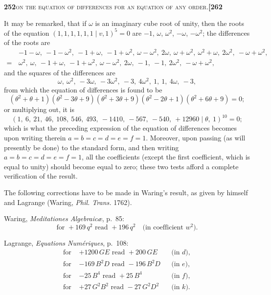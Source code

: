 \documentclass[11pt]{article}
\newcommand{\Cdel}{\mid}
\begin{document}
\newpage
\noindent\textbf{252}\hfill\textsc{on the equation of differences for an equation of any order.}\hfill\textbf{[262}

\medskip

\noindent It may be remarked, that if $\omega$ is an imaginary cube root of unity, then the roots of the equation $(1, 1, 1, 1, 1, 1 \Cdel v, 1)^5 = 0$ are $-1$, $\omega$, $\omega^2$, $-\omega$, $-\omega^2$; the differences of the roots are
\[
\begin{aligned}
  & -1 - \omega,\ -1 - \omega^2,\ -1 + \omega,\ -1 + \omega^2,\ \omega - \omega^2,\ 2\omega,\ \omega + \omega^2,\ \omega^2 + \omega,\ 2\omega^2,\ -\omega + \omega^2,\\
  =\,& \omega^2,\ \omega,\ -1 + \omega,\ -1 + \omega^2,\ \omega - \omega^2,\ 2\omega,\ -1,\ -1,\ 2\omega^2,\ -\omega + \omega^2,
\end{aligned}
\]
and the squares of the differences are
\[
  \omega,\ \omega^2,\ -3\omega,\ -3\omega^2,\ -3,\ 4\omega^2,\ 1,\ 1,\ 4\omega,\ -3,
\]
from which the equation of differences is found to be
\[
  (\theta^2 + \theta + 1)(\theta^2 - 3\theta + 9)(\theta^2 + 3\theta + 9)(\theta^2 - 2\theta + 1)(\theta^2 + 6\theta + 9) = 0;
\]
or multiplying out, it is
\[
  (1,\ 6,\ 21,\ 46,\ 108,\ 546,\ 493,\ -1410,\ -567,\ -540,\ +12960 \Cdel \theta,\ 1)^{10} = 0;
\]
which is what the preceding expression of the equation of differences becomes upon writing therein $a = b = c = d = e = f = 1$. Moreover, upon passing (as will presently be done) to the standard form, and then writing $a = b = c = d = e = f = 1$, all the coefficients (except the first coefficient, which is equal to unity) should become equal to zero; these two tests afford a complete verification of the result.

\medskip

\noindent The following corrections have to be made in Waring's result, as given by himself and Lagrange (Waring, \textit{Phil. Trans.} 1762).

\medskip

\noindent Waring, \textit{Meditationes Algebraic\ae}, p.~85:
\[
  \text{for } +169\,q^2 \text{ read } +196\,q^2 \quad \text{(in coefficient } w^2\text{)}.
\]

\noindent Lagrange, \textit{Equations Num\'eriques}, p.~108:
\[
\begin{aligned}
  \text{for } &+1200\,GE          \text{ read } +200\,GE   & &\text{(in } d\text{)},\\
  \text{for } &-169\,B^2 D        \text{ read } -196\,B^2 D & &\text{(in } e\text{)},\\
  \text{for } &-25\,B^4           \text{ read } +25\,B^4    & &\text{(in } f\text{)},\\
  \text{for } &+27\,G^2 B^2       \text{ read } -27\,G^2 D^2 & &\text{(in } k\text{)}.
\end{aligned}
\]
\end{document}
